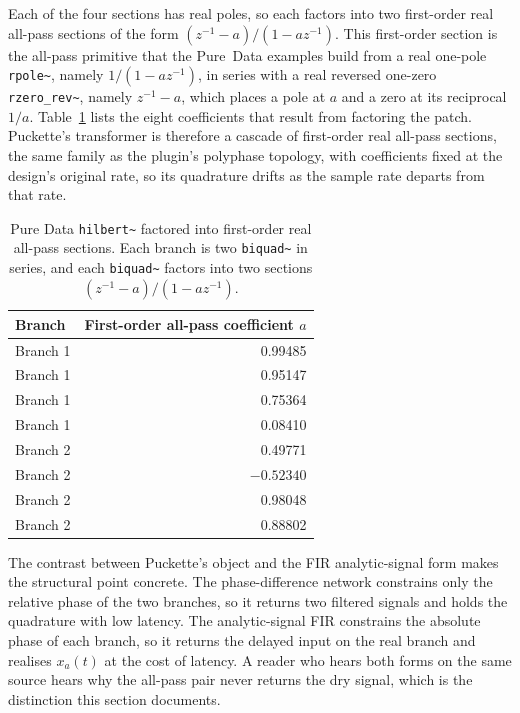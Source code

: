 \documentclass[11pt,a4paper]{article}
\begin{document}
Each of the four sections has real poles, so each factors into two first-order real all-pass sections of the form $(z^{-1} - a)/(1 - a z^{-1})$.
This first-order section is the all-pass primitive that the Pure~Data examples build from a real one-pole \texttt{rpole\textasciitilde}, namely $1/(1 - a z^{-1})$, in series with a real reversed one-zero \texttt{rzero\_rev\textasciitilde}, namely $z^{-1} - a$, which places a pole at $a$ and a zero at its reciprocal $1/a$.
Table~\ref{tab:puckette} lists the eight coefficients that result from factoring the patch.
Puckette's transformer is therefore a cascade of first-order real all-pass sections, the same family as the plugin's polyphase topology, with coefficients fixed at the design's original rate, so its quadrature drifts as the sample rate departs from that rate.

\begin{table}[h]
\centering
\caption{Pure Data \texttt{hilbert\textasciitilde} factored into first-order real all-pass sections. Each branch is two \texttt{biquad\textasciitilde} in series, and each \texttt{biquad\textasciitilde} factors into two sections $(z^{-1}-a)/(1-a z^{-1})$.}
\label{tab:puckette}
\begin{tabular}{@{}lr@{}}
\toprule
Branch & First-order all-pass coefficient $a$ \\
\midrule
Branch 1 & 0.99485 \\
Branch 1 & 0.95147 \\
Branch 1 & 0.75364 \\
Branch 1 & 0.08410 \\
\addlinespace
Branch 2 & 0.49771 \\
Branch 2 & $-0.52340$ \\
Branch 2 & 0.98048 \\
Branch 2 & 0.88802 \\
\bottomrule
\end{tabular}
\end{table}

The contrast between Puckette's object and the FIR analytic-signal form makes the structural point concrete.
The phase-difference network constrains only the relative phase of the two branches, so it returns two filtered signals and holds the quadrature with low latency.
The analytic-signal FIR constrains the absolute phase of each branch, so it returns the delayed input on the real branch and realises $x_a(t)$ at the cost of latency.
A reader who hears both forms on the same source hears why the all-pass pair never returns the dry signal, which is the distinction this section documents.
\end{document}
